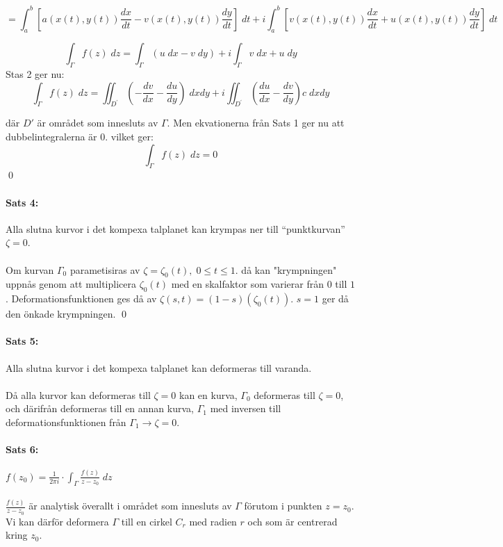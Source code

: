\documentclass{article}
\begin{document}
$$= \int_a^b \left [a(x(t), y(t)) \frac {dx} {dt} - v(x(t), y(t)) \frac {dy} {dt} \right ] \; dt + i \int_a^b \left [v(x(t), y(t)) \frac {dx} {dt} + 
u(x(t), y (t)) \frac {dy} {dt} \right ] \; dt$$

$$\int_{\Gamma} f(z) \; dz = \int_\Gamma (u \; dx - v \; dy) + i \int_\Gamma v \; dx + u \; dy$$
Stas 2 ger nu:
$$\int_{\Gamma} f(z) \; dz = \iint_{D^\prime} \left ( - \frac {dv} {dx} - \frac {du} {dy} \right ) \; dxdy +
i \iint_{D^\prime} \left ( \frac {du} {dx} - \frac {dv} {dy} \right )c \; dxdy$$

där $D'$ är området som innesluts av $\Gamma$. Men ekvationerna från Sats 1 ger nu att
dubbelintegralerna är $0$. vilket ger:
$$\int_\Gamma f(z) \; dz = 0$$
\hfill \qed

\paragraph{Sats 4:} Alla slutna kurvor i det kompexa talplanet kan krympas ner till ``punktkurvan'' $\zeta = 0$.\\
\\
Om kurvan $\Gamma_0$ parametisiras av $\zeta = \zeta_0(t), \; 0 \le t \le 1.$
då kan "krympningen" uppnås genom att multiplicera $\zeta_0(t)$ med en skalfaktor som varierar från $0$ till $1$. 
Deformationsfunktionen ges då av $\zeta(s, t) = (1-s)(\zeta_0(t)).$ $s = 1$ ger då den önkade krympningen.
\hfill \qed

\paragraph{Sats 5:} Alla slutna kurvor i det kompexa talplanet kan deformeras till varanda.\\
\\
Då alla kurvor kan deformeras till $\zeta = 0$ kan en kurva, $\Gamma_0$ deformeras till $\zeta = 0$, och därifrån deformeras 
till en annan kurva, $\Gamma_1$ med inversen till deformationsfunktionen från $\Gamma_1 \to \zeta = 0$.\\

\paragraph{Sats 6:} $f(z_0) = \frac 1 {2\pi i} \cdot \int_\Gamma \frac {f(z)} {z - z_0} \; dz$ \\
\\
$\frac {f(z)} {z - z_0}$ är analytisk överallt i området som innesluts av $\Gamma$ förutom i punkten
$z = z_0$. Vi kan därför deformera $\Gamma$ till en cirkel $C_r$ med radien $r$ och 
som är centrerad kring $z_0$.
\end{document}
